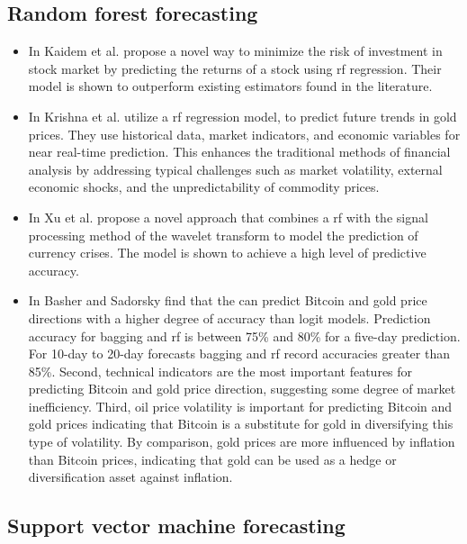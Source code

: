 \subsection{Random forest forecasting}\label{Random Forest forecasting}

\begin{itemize}
    \item In \cite{prediction} Kaidem et al. propose a novel way to minimize the risk of investment in stock market by predicting the returns of a stock using \gls{rf} regression. Their model is shown to outperform existing estimators found in the literature.
    \item In \cite{gold} Krishna et al. utilize a \gls{rf} regression model, to predict future trends in gold prices. They use historical data, market indicators, and economic variables for near real-time prediction. This enhances the traditional methods of financial analysis by addressing typical challenges such as market volatility, external economic shocks, and the unpredictability of commodity prices.
    \item In \cite{wavelet} Xu et al. propose a novel approach that combines a \gls{rf} with the signal processing method of the wavelet transform to model the prediction of currency crises. The model is shown to achieve a high level of predictive accuracy.
    \item In \cite{bitcoin} Basher and Sadorsky find that the  can predict Bitcoin and gold price directions with a higher degree of accuracy than logit models. Prediction accuracy for bagging and \gls{rf} is between 75\% and 80\% for a five-day prediction. For 10-day to 20-day forecasts bagging and \gls{rf} record accuracies greater than 85\%. Second, technical indicators are the most important features for predicting Bitcoin and gold price direction, suggesting some degree of market inefficiency. Third, oil price volatility is important for predicting Bitcoin and gold prices indicating that Bitcoin is a substitute for gold in diversifying this type of volatility. By comparison, gold prices are more influenced by inflation than Bitcoin prices, indicating that gold can be used as a hedge or diversification asset against inflation.
\end{itemize}

\subsection{Support vector machine forecasting}\label{Support vector machine forecasting}

